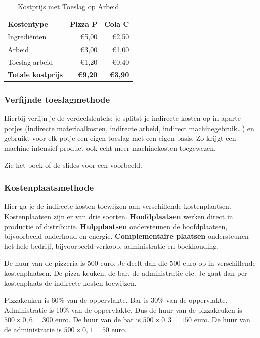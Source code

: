\documentclass[a4paper,11pt]{article}
\begin{document}
\begin{table}[ht]
    \centering
    \begin{tabular}{|l|r|r|}
        \hline
        \textbf{Kostentype}       & \textbf{Pizza P} & \textbf{Cola C} \\
        \hline
        Ingrediënten              & €5,00            & €2,50           \\
        Arbeid                    & €3,00            & €1,00           \\
        Toeslag arbeid            & €1,20            & €0,40           \\
        \hline
        \textbf{Totale kostprijs} & \textbf{€9,20}   & \textbf{€3,90}  \\
        \hline
    \end{tabular}
    \caption{Kostprijs met Toeslag op Arbeid}
\end{table}

\subsubsection{Verfijnde toeslagmethode}
Hierbij verfijn je de verdeelsleutels: je splitst je indirecte kosten op in
aparte potjes (indirecte materiaalkosten, indirecte arbeid, indirect machinegebruik\dots)
en gebruikt voor elk potje een eigen toeslag met een eigen basis.
Zo krijgt een machine-intensief product ook echt meer machinekosten toegewezen.
\newline

Zie het boek of de slides voor een voorbeeld.


\subsubsection{Kostenplaatsmethode}
Hier ga je de indirecte kosten toewijzen aan verschillende kostenplaatsen.
Kostenplaatsen zijn er van drie soorten.
\textbf{Hoofdplaatsen} werken direct in productie of distributie.
\textbf{Hulpplaatsen} ondersteunen de hoofdplaatsen, bijvoorbeeld onderhoud en energie.
\textbf{Complementaire plaatsen} ondersteunen het hele bedrijf, bijvoorbeeld verkoop, administratie en boekhouding.
\newline

De huur van de pizzeria is 500 euro.
Je deelt dan die 500 euro op in verschillende kostenplaatsen.
De pizza keuken, de bar, de administratie etc.
Je gaat dan per kostenplaats de indirecte kosten toewijzen.

Pizzakeuken is 60\% van de oppervlakte.
Bar is 30\% van de oppervlakte.
Administratie is 10\% van de oppervlakte.
\newline
Dus de huur van de pizzakeuken is $500 \times 0{,}6 = 300$ euro.
De huur van de bar is $500 \times 0{,}3 = 150$ euro.
De huur van de administratie is $500 \times 0{,}1 = 50$ euro.
\newline
\end{document}
